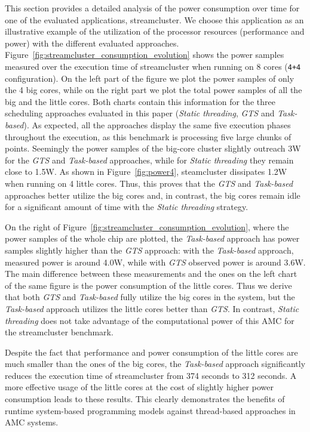 This section provides a detailed analysis of the power consumption over time for one of the evaluated applications, streamcluster.
We choose this application as an illustrative example of the utilization of the processor resources 
(performance and power) with the different evaluated approaches.
Figure~\ref{fig:streamcluster_consumption_evolution} shows the power samples measured over the 
execution time of streamcluster when running on 8 cores (\texttt{4+4} configuration).
On the left part of the figure we plot the power samples of only the 4 big cores, while on the right part we plot the total power samples of all the big and the little cores.
Both charts contain this information for the three scheduling approaches evaluated in this paper (\emph{Static threading}, \emph{GTS} and \emph{Task-based}).
As expected, all the approaches display the same five execution phases throughout the execution, as this benchmark is processing five large chunks of points.
Seemingly the power samples of the big-core cluster slightly outreach 3W for the \emph{GTS} and \emph{Task-based} approaches, while for \emph{Static threading} they remain close to 1.5W. As shown in Figure~\ref{fig:power4}, steamcluster dissipates 1.2W when running on 4 little cores.
Thus, this proves that the \emph{GTS} and \emph{Task-based} approaches better utilize the big cores and, in contrast, the big cores remain idle for a significant amount of time with the \emph{Static threading} strategy.

On the right of Figure~\ref{fig:streamcluster_consumption_evolution}, where the power samples of the whole chip are plotted, the \emph{Task-based} approach has power samples slightly higher than the \emph{GTS} approach:
with the \emph{Task-based} approach, measured power is around 4.0W, while with \emph{GTS} observed power is around 3.6W.
The main difference between these measurements and the ones on the left chart of the same figure is the power consumption of the little cores. 
Thus we derive that both \emph{GTS} and \emph{Task-based} fully utilize the big cores in the system, but the \emph{Task-based} approach utilizes the little cores better than \emph{GTS}. In contrast, \emph{Static threading} does not take advantage of the computational power of this AMC for the streamcluster benchmark.

Despite the fact that performance and power consumption of the little cores are much smaller than the ones of the big cores, the \emph{Task-based} approach significantly reduces the execution time of streamcluster from 374 seconds to 312 seconds. A more effective usage of the little cores at the cost of slightly higher power consumption leads to these results. This clearly demonstrates the benefits of runtime system-based programming models against thread-based approaches in AMC systems.
\fi


